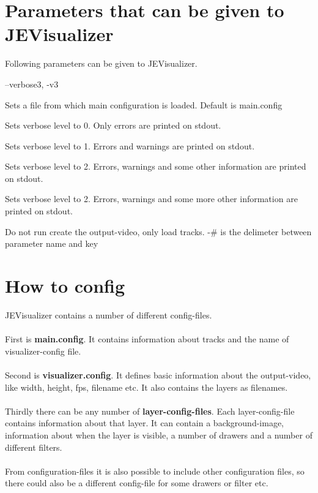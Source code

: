 \documentclass{article}
\begin{document}
  \section{Parameters that can be given to JEVisualizer}
    Following parameters can be given to JEVisualizer.
    \begin{labeling}{--verbose3, -v3}
      \item [--config \underline{file}] Sets a file from which main configuration is loaded. Default is main.config    
      \item [--verbose0, -v0]           Sets verbose level to 0. Only errors are printed on stdout.
      \item [--verbose1, -v1]           Sets verbose level to 1. Errors and warnings are printed on stdout.
      \item [--verbose2, -v2]           Sets verbose level to 2. Errors, warnings and some other information are printed on stdout.
      \item [--verbose3, -v3]           Sets verbose level to 2. Errors, warnings and some more other information are printed on stdout.
      \item [--no-run]                  Do not run create the output-video, only load tracks.
    -\# is the delimeter between parameter name and key 
    \end{labeling}
  \section{How to config}
    JEVisualizer contains a number of different config-files.\\ \\
    First is \textbf{main.config}. It contains information about tracks and the name of visualizer-config file. \\ \\
    Second is \textbf{visualizer.config}. It defines basic information about the output-video, like width, height, fps, filename etc. It also contains the layers as filenames. \\ \\
    Thirdly there can be any number of \textbf{layer-config-files}. Each layer-config-file contains information about that layer. It can contain
    a background-image, information about when the layer is visible, a number of drawers and a number of different filters. \\ \\
    From configuration-files it is also possible to include other configuration files, so there could also be a different config-file for some drawers or filter etc. \\ \\
    
\end{document}
